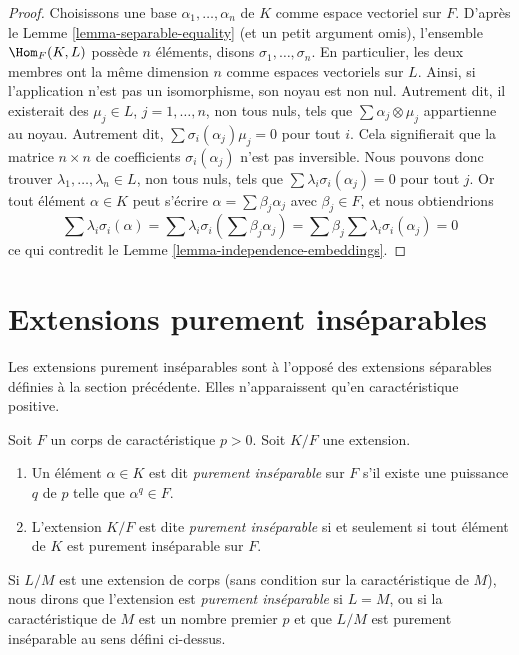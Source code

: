 \begin{proof}
Choisissons une base $\alpha_1, \ldots, \alpha_n$ de $K$ comme espace vectoriel sur $F$.
D'après le Lemme \ref{lemma-separable-equality} (et un petit argument omis), l'ensemble
$\Hom_F(K, L)$ possède $n$ éléments, disons $\sigma_1, \ldots, \sigma_n$.
En particulier, les deux membres ont la même dimension $n$ comme espaces
vectoriels sur $L$. Ainsi, si l'application n'est pas un isomorphisme, son
noyau est non nul. Autrement dit, il existerait des
$\mu_j \in L$, $j = 1, \ldots, n$, non tous nuls,
tels que $\sum \alpha_j \otimes \mu_j$ appartienne au noyau.
Autrement dit, $\sum \sigma_i(\alpha_j)\mu_j = 0$ pour tout $i$.
Cela signifierait que la matrice $n \times n$ de coefficients
$\sigma_i(\alpha_j)$ n'est pas inversible. Nous pouvons donc trouver
$\lambda_1, \ldots, \lambda_n \in L$, non tous nuls,
tels que $\sum \lambda_i\sigma_i(\alpha_j) = 0$ pour tout $j$.
Or tout élément $\alpha \in K$ peut s'écrire
$\alpha = \sum \beta_j \alpha_j$ avec $\beta_j \in F$, et nous obtiendrions
$$
\sum \lambda_i\sigma_i(\alpha) =
\sum \lambda_i\sigma_i(\sum \beta_j \alpha_j) =
\sum \beta_j \sum \lambda_i\sigma_i(\alpha_j) = 0
$$
ce qui contredit le Lemme \ref{lemma-independence-embeddings}.
\end{proof}







\section{Extensions purement inséparables}
\label{section-purely-inseparable}

\noindent
Les extensions purement inséparables sont à l'opposé des extensions
séparables définies à la section précédente. Elles n'apparaissent
qu'en caractéristique positive.

\begin{definition}
\label{definition-purely-inseparable}
Soit $F$ un corps de caractéristique $p > 0$. Soit $K/F$ une extension.
\begin{enumerate}
\item Un élément $\alpha \in K$ est dit {\it purement inséparable} sur $F$
s'il existe une puissance $q$ de $p$ telle que $\alpha^q \in F$.
\item L'extension $K/F$ est dite {\it purement inséparable}
si et seulement si tout élément de $K$ est purement inséparable sur $F$.
\end{enumerate}
Si $L/M$ est une extension de corps (sans condition sur la caractéristique
de $M$), nous dirons que l'extension est {\it purement inséparable}
si $L = M$, ou si la caractéristique de $M$ est un nombre premier $p$
et que $L/M$ est purement inséparable au sens défini ci-dessus.
\end{definition}

